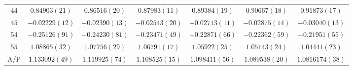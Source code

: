 \begin{table}
\begin{center}
\begin{tabular}{c|c c c c c c}
$44$ & $0.84903(21)$ & $0.86516(20)$ & $0.87983(11)$ & $0.89384(19)$ & $0.90667(18)$ & $0.91873(17)$ \\
$45$ & $-0.02229(12)$ & $-0.02390(13)$ & $-0.02543(20)$ & $-0.02713(11)$ & $-0.02875(14)$ & $-0.03040(13)$ \\
$54$ & $-0.25126(91)$ & $-0.24230(81)$ & $-0.23471(49)$ & $-0.22871(66)$ & $-0.22362(59)$ & $-0.21951(55)$ \\
$55$ & $1.08865(32)$ & $1.07756(29)$ & $1.06791(17)$ & $1.05922(25)$ & $1.05143(24)$ & $1.04441(23)$ \\
\hline
A/P & $1.133092(49)$ & $1.119925(74)$ & $1.108525(15)$ & $1.098411(56)$ & $1.089538(20)$ & $1.0816174(38)$ \\
\hline
\hline
\end{tabular}
\end{center}
\end{table}